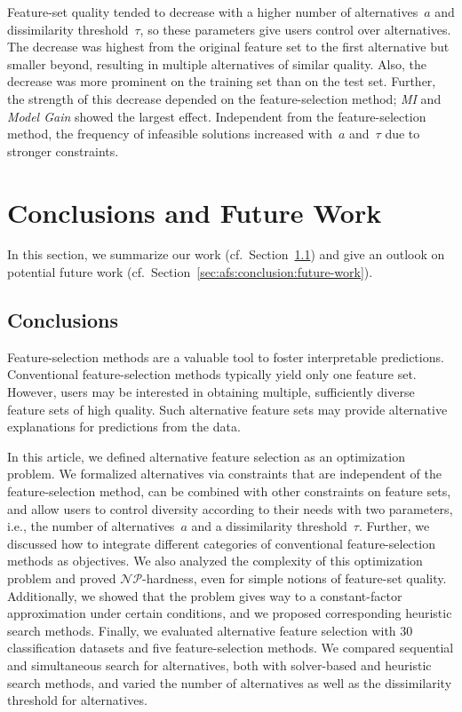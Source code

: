\documentclass{article}
\theoremstyle{definition}
\begin{document}
Feature-set quality tended to decrease with a higher number of alternatives~$a$ and dissimilarity threshold~$\tau$, so these parameters give users control over alternatives.
The decrease was highest from the original feature set to the first alternative but smaller beyond, resulting in multiple alternatives of similar quality.
Also, the decrease was more prominent on the training set than on the test set.
Further, the strength of this decrease depended on the feature-selection method;
\emph{MI} and \emph{Model Gain} showed the largest effect.
Independent from the feature-selection method, the frequency of infeasible solutions increased with~$a$ and~$\tau$ due to stronger constraints.

\section{Conclusions and Future Work}
\label{sec:afs:conclusion}

In this section, we summarize our work (cf.~Section~\ref{sec:afs:conclusion:conclusion}) and give an outlook on potential future work (cf.~Section~\ref{sec:afs:conclusion:future-work}).

\subsection{Conclusions}
\label{sec:afs:conclusion:conclusion}

Feature-selection methods are a valuable tool to foster interpretable predictions.
Conventional feature-selection methods typically yield only one feature set.
However, users may be interested in obtaining multiple, sufficiently diverse feature sets of high quality.
Such alternative feature sets may provide alternative explanations for predictions from the data.

In this article, we defined alternative feature selection as an optimization problem.
We formalized alternatives via constraints that are independent of the feature-selection method, can be combined with other constraints on feature sets, and allow users to control diversity according to their needs with two parameters, i.e., the number of alternatives~$a$ and a dissimilarity threshold~$\tau$.
Further, we discussed how to integrate different categories of conventional feature-selection methods as objectives.
We also analyzed the complexity of this optimization problem and proved $\mathcal{NP}$-hardness, even for simple notions of feature-set quality.
Additionally, we showed that the problem gives way to a constant-factor approximation under certain conditions, and we proposed corresponding heuristic search methods.
Finally, we evaluated alternative feature selection with 30 classification datasets and five feature-selection methods.
We compared sequential and simultaneous search for alternatives, both with solver-based and heuristic search methods, and varied the number of alternatives as well as the dissimilarity threshold for alternatives.
\end{document}
